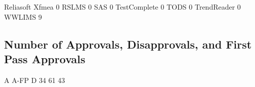 \documentclass{article}
\begin{document}
\begin{Schunk}
\begin{Soutput}
                                          Reliasoft Xfmea 
                                                        0 
                                                    RSLMS 
                                                        0 
                                                      SAS 
                                                        0 
                                             TestComplete 
                                                        0 
                                                     TODS 
                                                        0 
                                              TrendReader 
                                                        0 
                                                   WWLIMS 
                                                        9 
\end{Soutput}
\end{Schunk}

\subsection{Number of Approvals, Disapprovals, and First Pass Approvals}

\begin{Schunk}
\begin{Soutput}
   A A-FP    D 
  34   61   43 
\end{Soutput}
\end{Schunk}
\end{document}
